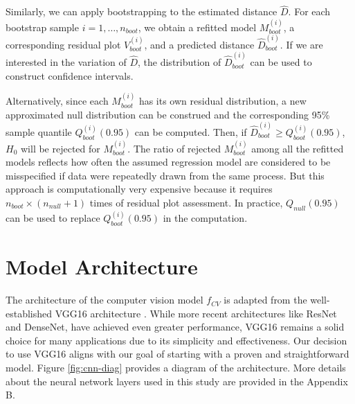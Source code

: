 \documentclass[]{interact}
\theoremstyle{plain}%
\theoremstyle{definition}
\theoremstyle{remark}
\begin{document}
Similarly, we can apply bootstrapping to the estimated distance
\(\hat{D}\). For each bootstrap sample \(i = 1, \dots, n_{boot}\), we
obtain a refitted model \(M^{(i)}_{boot}\), a corresponding residual
plot \(V^{(i)}_{boot}\), and a predicted distance
\(\hat{D}^{(i)}_{boot}\). If we are interested in the variation of
\(\hat{D}\), the distribution of \(\hat{D}^{(i)}_{boot}\) can be used to
construct confidence intervals.

Alternatively, since each \(M_{boot}^{(i)}\) has its own residual
distribution, a new approximated null distribution can be construed and
the corresponding 95\% sample quantile \(Q_{boot}^{(i)}(0.95)\) can be
computed. Then, if \(\hat{D}_{boot}^{(i)} \geq Q_{boot}^{(i)}(0.95)\),
\(H_0\) will be rejected for \(M_{boot}^{(i)}\). The ratio of rejected
\(M_{boot}^{(i)}\) among all the refitted models reflects how often the
assumed regression model are considered to be misspecified if data were
repeatedly drawn from the same process. But this approach is
computationally very expensive because it requires
\(n_{boot} \times (n_{null} + 1)\) times of residual plot assessment. In
practice, \(Q_{null}(0.95)\) can be used to replace
\(Q_{boot}^{(i)}(0.95)\) in the computation.

\section{Model Architecture}\label{sec-model-architecture}

The architecture of the computer vision model \(f_{CV}\) is adapted from
the well-established VGG16 architecture \citep{simonyan2014very}. While
more recent architectures like ResNet \citep{he2016deep} and
DenseNet\citep{huang2017densely}, have achieved even greater
performance, VGG16 remains a solid choice for many applications due to
its simplicity and effectiveness. Our decision to use VGG16 aligns with
our goal of starting with a proven and straightforward model. Figure
\ref{fig:cnn-diag} provides a diagram of the architecture. More details
about the neural network layers used in this study are provided in the
Appendix B.
\end{document}
